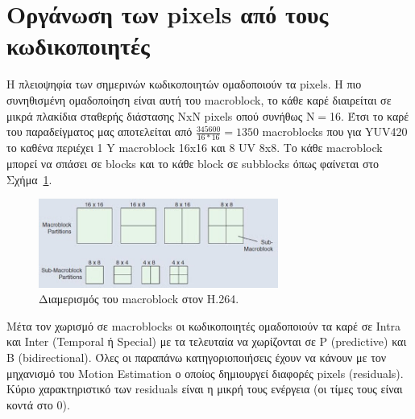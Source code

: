 \newpage
\section{Οργάνωση των pixels από τους κωδικοποιητές}
\label{section:sect23}

\indent Η πλειοψηφία των σημερινών κωδικοποιητών ομαδοποιούν τα pixels. Η πιο συνηθισμένη ομαδοποίηση είναι αυτή του macroblock, το κάθε καρέ διαιρείται σε μικρά πλακίδια σταθερής διάστασης NxN pixels οπού συνήθως N$=$16. Έτσι το καρέ του παραδείγματος μας αποτελείται από $\frac{345600}{16*16} = 1350$ macroblocks που για YUV420 το καθένα περιέχει 1 Y macroblock 16x16 και 8 UV 8x8. Το κάθε macroblock μπορεί να σπάσει σε blocks και το κάθε block σε subblocks όπως φαίνεται στο Σχήμα~\ref{fig:mbpart}.

\begin{figure}[H]
  \centering
    \includegraphics[width=0.7\textwidth]{chapter2/mbpart.jpg}
  \caption{Διαμερισμός του macroblock στον H.264.\cite{misc:mbpart}}
  \label{fig:mbpart}
\end{figure}

\indent Μέτα τον χωρισμό σε macroblocks οι κωδικοποιητές ομαδοποιούν τα καρέ σε Intra και Inter (Temporal ή Special) με τα τελευταία να χωρίζονται σε P (predictive) και Β (bidirectional). Όλες οι παραπάνω κατηγοριοποιήσεις έχουν να κάνουν με τον μηχανισμό του Motion Estimation ο οποίος δημιουργεί διαφορές pixels (residuals). Κύριο χαρακτηριστικό των residuals είναι η μικρή τους ενέργεια (οι τίμες τους είναι κοντά στο 0).

